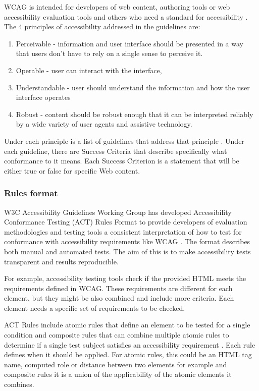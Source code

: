 \documentclass{master_thesis}
\begin{document}
WCAG is intended for developers of web content, authoring tools or web accessibility evaluation tools and others who need a standard for accessibility \citep{Henry2023}. The 4 principles of accessibility addressed in the guidelines are:
\begin{enumerate}
	\item Perceivable - information and user interface should be presented in a way that users don't have to rely on a single sense to perceive it.
	\item Operable - user can interact with the interface,
	\item Understandable - user should understand the information and how the user interface operates
	\item Robust - content should be robust enough that it can be interpreted reliably by a wide variety of user agents and assistive technology.
\end{enumerate}
Under each principle is a list of guidelines that address that principle \citep{AGWGWP2022}. Under each guideline, there are Success Criteria that describe specifically what conformance to it means. Each Success Criterion is a statement that will be either true or false for specific Web content.

\subsubsection{Rules format}

W3C Accessibility Guidelines Working Group has developed Accessibility Conformance Testing (ACT) Rules Format to provide developers of evaluation methodologies and testing tools a consistent interpretation of how to test for conformance with accessibility requirements like WCAG \citep{Fiers2019}. The format describes both manual and automated tests. The aim of this is to make accessibility tests transparent and results reproducible.

For example, accessibility testing tools check if the provided HTML meets the requirements defined in WCAG. These requirements are different for each element, but they might be also combined and include more criteria. Each element needs a specific set of requirements to be checked.

ACT Rules include atomic rules that define an element to be tested for a single condition and composite rules that can combine multiple atomic rules to determine if a single test subject satisfies an accessibility requirement \citep{Fiers2019}. Each rule defines when it should be applied. For atomic rules, this could be an HTML tag name, computed role or distance between two elements for example and composite rules it is a union of the applicability of the atomic elements it combines.
\end{document}
